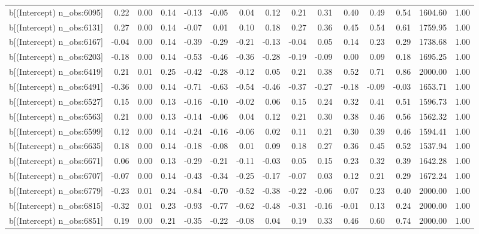 \begin{table}[ht]
\begin{tabular}{rrrrrrrrrrrrrrr}
  b[(Intercept) n\_obs:6095] & 0.22 & 0.00 & 0.14 & -0.13 & -0.05 & 0.04 & 0.12 & 0.21 & 0.31 & 0.40 & 0.49 & 0.54 & 1604.60 & 1.00 \\ 
  b[(Intercept) n\_obs:6131] & 0.27 & 0.00 & 0.14 & -0.07 & 0.01 & 0.10 & 0.18 & 0.27 & 0.36 & 0.45 & 0.54 & 0.61 & 1759.95 & 1.00 \\ 
  b[(Intercept) n\_obs:6167] & -0.04 & 0.00 & 0.14 & -0.39 & -0.29 & -0.21 & -0.13 & -0.04 & 0.05 & 0.14 & 0.23 & 0.29 & 1738.68 & 1.00 \\ 
  b[(Intercept) n\_obs:6203] & -0.18 & 0.00 & 0.14 & -0.53 & -0.46 & -0.36 & -0.28 & -0.19 & -0.09 & 0.00 & 0.09 & 0.18 & 1695.25 & 1.00 \\ 
  b[(Intercept) n\_obs:6419] & 0.21 & 0.01 & 0.25 & -0.42 & -0.28 & -0.12 & 0.05 & 0.21 & 0.38 & 0.52 & 0.71 & 0.86 & 2000.00 & 1.00 \\ 
  b[(Intercept) n\_obs:6491] & -0.36 & 0.00 & 0.14 & -0.71 & -0.63 & -0.54 & -0.46 & -0.37 & -0.27 & -0.18 & -0.09 & -0.03 & 1653.71 & 1.00 \\ 
  b[(Intercept) n\_obs:6527] & 0.15 & 0.00 & 0.13 & -0.16 & -0.10 & -0.02 & 0.06 & 0.15 & 0.24 & 0.32 & 0.41 & 0.51 & 1596.73 & 1.00 \\ 
  b[(Intercept) n\_obs:6563] & 0.21 & 0.00 & 0.13 & -0.14 & -0.06 & 0.04 & 0.12 & 0.21 & 0.30 & 0.38 & 0.46 & 0.56 & 1562.32 & 1.00 \\ 
  b[(Intercept) n\_obs:6599] & 0.12 & 0.00 & 0.14 & -0.24 & -0.16 & -0.06 & 0.02 & 0.11 & 0.21 & 0.30 & 0.39 & 0.46 & 1594.41 & 1.00 \\ 
  b[(Intercept) n\_obs:6635] & 0.18 & 0.00 & 0.14 & -0.18 & -0.08 & 0.01 & 0.09 & 0.18 & 0.27 & 0.36 & 0.45 & 0.52 & 1537.94 & 1.00 \\ 
  b[(Intercept) n\_obs:6671] & 0.06 & 0.00 & 0.13 & -0.29 & -0.21 & -0.11 & -0.03 & 0.05 & 0.15 & 0.23 & 0.32 & 0.39 & 1642.28 & 1.00 \\ 
  b[(Intercept) n\_obs:6707] & -0.07 & 0.00 & 0.14 & -0.43 & -0.34 & -0.25 & -0.17 & -0.07 & 0.03 & 0.12 & 0.21 & 0.29 & 1672.24 & 1.00 \\ 
  b[(Intercept) n\_obs:6779] & -0.23 & 0.01 & 0.24 & -0.84 & -0.70 & -0.52 & -0.38 & -0.22 & -0.06 & 0.07 & 0.23 & 0.40 & 2000.00 & 1.00 \\ 
  b[(Intercept) n\_obs:6815] & -0.32 & 0.01 & 0.23 & -0.93 & -0.77 & -0.62 & -0.48 & -0.31 & -0.16 & -0.01 & 0.13 & 0.24 & 2000.00 & 1.00 \\ 
  b[(Intercept) n\_obs:6851] & 0.19 & 0.00 & 0.21 & -0.35 & -0.22 & -0.08 & 0.04 & 0.19 & 0.33 & 0.46 & 0.60 & 0.74 & 2000.00 & 1.00 \\ 

\end{tabular}
\end{table}
